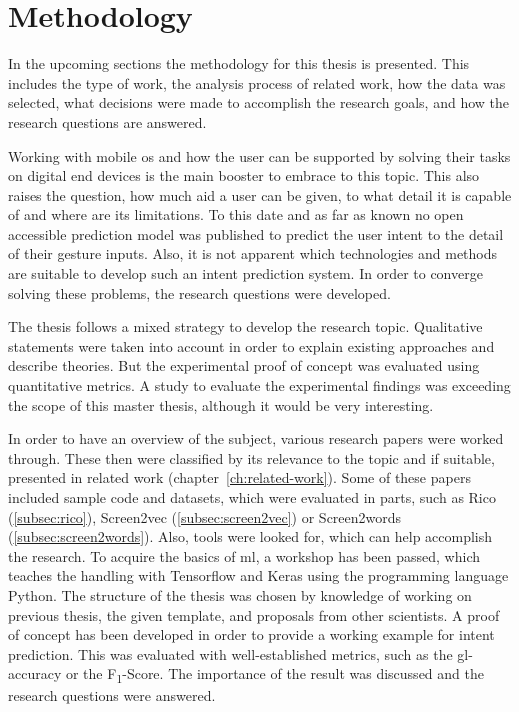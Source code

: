 \chapter{Methodology}

In the upcoming sections the methodology for this thesis is presented.
This includes the type of work,
the analysis process of related work,
how the data was selected,
what decisions were made to accomplish the research goals,
and how the research questions are answered.

Working with mobile \gls{os} and how the user can be supported by solving their tasks on digital end devices is the main booster to embrace to this topic.
This also raises the question, how much aid a user can be given, to what detail it is capable of and where are its limitations.
To this date and as far as known no open accessible prediction model was published to predict the user intent to the detail of their gesture inputs.
Also, it is not apparent which technologies and methods are suitable to develop such an intent prediction system.
In order to converge solving these problems, the research questions were developed.

The thesis follows a mixed strategy to develop the research topic.
Qualitative statements were taken into account in order to explain existing approaches and describe theories.
But the experimental proof of concept was evaluated using quantitative metrics.
A study to evaluate the experimental findings was exceeding the scope of this master thesis, although it would be very interesting.

In order to have an overview of the subject, various research papers were worked through.
These then were classified by its relevance to the topic and if suitable, presented in related work (chapter~\ref{ch:related-work}).
Some of these papers included sample code and datasets, which were evaluated in parts, such as Rico (\ref{subsec:rico}), Screen2vec (\ref{subsec:screen2vec}) or Screen2words (\ref{subsec:screen2words}).
Also, tools were looked for, which can help accomplish the research.
To acquire the basics of \gls{ml}, a workshop has been passed, which teaches the handling with Tensorflow and Keras using the programming language Python.
The structure of the thesis was chosen by knowledge of working on previous thesis, the given template, and proposals from other scientists.
A proof of concept has been developed in order to provide a working example for intent prediction.
This was evaluated with well-established metrics, such as the \gls{gl-accuracy} or the F\textsubscript{1}-Score.
The importance of the result was discussed and the research questions were answered.


